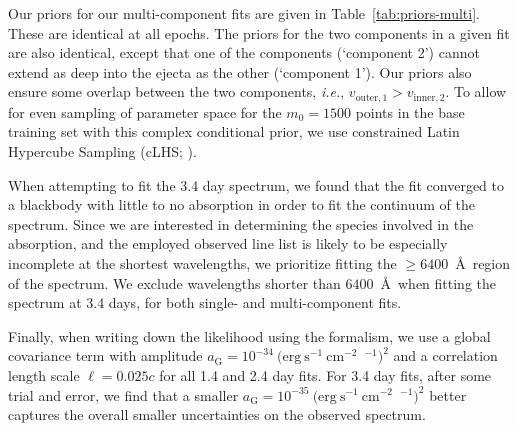 \documentclass[twocolumn, twocolappendix]{aastex63}
\def\SPARK{\texttt{SPARK}}
\newcommand\redbf[1]{\textbf{\textcolor{red}{#1}}}
\def\ie{{\it i.e.}}
\begin{document}
Our priors for our multi-component fits are given in Table~\ref{tab:priors-multi}. These are identical at all epochs. The priors for the two components in a given fit are also identical, except that one of the components (`component 2') cannot extend as deep into the ejecta as the other (`component 1'). Our priors also ensure some overlap between the two components, \ie, $v_{\mathrm{outer,1}} > v_{\mathrm{inner,2}}$. To allow for even sampling of parameter space for the $m_0 = 1500$ points in the base training set with this complex conditional prior, we use constrained Latin Hypercube Sampling (cLHS; \citealt{petelet09}).
    
When attempting to fit the 3.4 day spectrum, we found that the fit converged to a blackbody with little to no absorption in order to fit the continuum of the spectrum. Since we are interested in determining the species involved in the absorption, and the employed observed line list is likely to be especially incomplete at the shortest wavelengths, we prioritize fitting the $\geqslant 6400$~\AA~region of the spectrum. We exclude wavelengths shorter than $6400$~\AA~when fitting the spectrum at 3.4 days, for both single- and multi-component fits.

Finally, when writing down the likelihood using the \cite{czekala15} formalism, we use a global covariance term with amplitude $a_{\mathrm{G}} = 10^{-34}~(\mathrm{erg~s^{-1}~cm^{-2}}$~\text{\AA}${}^{-1})^{2}$ and a correlation length scale $\ell = 0.025c$ for all 1.4 and 2.4 day fits. For 3.4 day fits, after some trial and error, we find that a smaller $a_{\mathrm{G}} = 10^{-35}~(\mathrm{erg~s^{-1}~cm^{-2}}$~\text{\AA}${}^{-1})^{2}$ better captures the overall smaller uncertainties on the observed spectrum.


    
\end{document}
